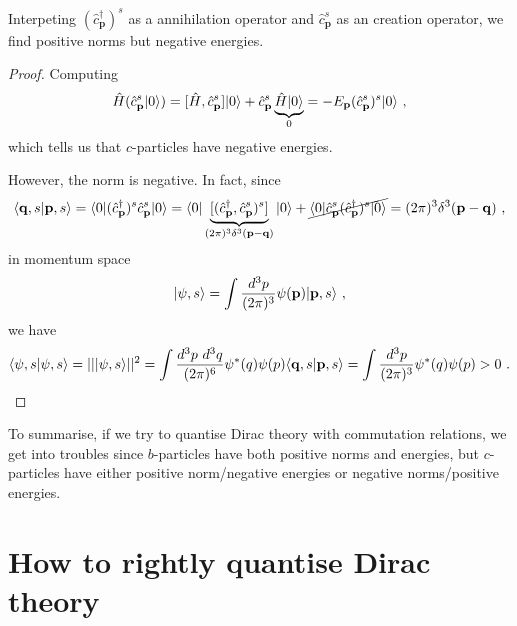     Interpeting $(\hat c^\dagger_{\mathbf p})^s$ as a annihilation operator and $\hat c^s_{\mathbf p}$ as an creation operator, we find positive norms but negative energies. 
    \begin{proof}
        Computing 
        \begin{equation*}
            \hat H (\hat c^s_{\mathbf p} \vert0\rangle) = [\hat H, \hat c^s_{\mathbf p}] \vert0\rangle + \hat c^s_{\mathbf p} \underbrace{\hat H \vert0\rangle}_0 = - E_\mathbf p (\hat c^s_{\mathbf p})^s \vert0\rangle ~,
        \end{equation*}
        which tells us that $c$-particles have negative energies.

        However, the norm is negative. In fact, since
        \begin{equation*}
            \langle\mathbf q, s\vert\mathbf p, s\rangle = \langle0\vert (\hat c^\dagger_{\mathbf p})^s \hat c^s_{\mathbf p} \vert0\rangle = \langle0\vert \underbrace{[(\hat c^\dagger_{\mathbf p} , \hat c^s_{\mathbf p})^s]}_{(2\pi)^3 \delta^3 (\mathbf p - \mathbf q)} \vert0\rangle + \cancel{\langle0\vert \hat c^s_{\mathbf p} (\hat c^\dagger_{\mathbf p})^s \vert0\rangle} = (2\pi)^3 \delta^3 (\mathbf p - \mathbf q) ~,
        \end{equation*}
        in momentum space 
        \begin{equation*}
            \vert\psi, s\rangle = \int \frac{d^3 p}{(2\pi)^3} \psi (\mathbf p) \vert\mathbf p, s\rangle ~,
        \end{equation*}
        we have 
        \begin{equation*}
            \langle\psi, s\vert\psi, s\rangle = ||\vert\psi, s\rangle||^2 = \int \frac{d^3 p ~ d^3 q}{(2\pi)^6} \psi^* \mathbf(q) \psi \mathbf(p) \langle\mathbf q, s\vert\mathbf p, s\rangle = \int \frac{d^3 p}{(2\pi)^3} \psi^* \mathbf(q) \psi \mathbf(p) > 0 ~.
        \end{equation*}
    \end{proof}

    To summarise, if we try to quantise Dirac theory with commutation relations, we get into troubles since $b$-particles have both positive norms and energies, but $c$-particles have either positive norm/negative energies or negative norms/positive energies. 

\chapter{How to rightly quantise Dirac theory}

